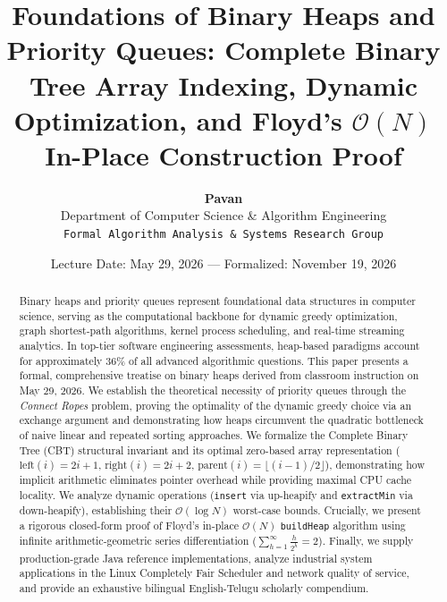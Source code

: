 \documentclass[10pt,twocolumn,letterpaper]{article}
\begin{document}
\title{\Large\bfseries Foundations of Binary Heaps and Priority Queues: Complete Binary Tree Array Indexing, Dynamic Optimization, and Floyd's $\mathcal{O}(N)$ In-Place Construction Proof}

\author{\textbf{Pavan}\\
Department of Computer Science \& Algorithm Engineering\\
\texttt{Formal Algorithm Analysis \& Systems Research Group}
}

\date{Lecture Date: May 29, 2026 --- Formalized: November 19, 2026}

\maketitle
\thispagestyle{firstpage}

\begin{abstract}
Binary heaps and priority queues represent foundational data structures in computer science, serving as the computational backbone for dynamic greedy optimization, graph shortest-path algorithms, kernel process scheduling, and real-time streaming analytics. In top-tier software engineering assessments, heap-based paradigms account for approximately 36\% of all advanced algorithmic questions. This paper presents a formal, comprehensive treatise on binary heaps derived from classroom instruction on May 29, 2026. We establish the theoretical necessity of priority queues through the \emph{Connect Ropes} problem, proving the optimality of the dynamic greedy choice via an exchange argument and demonstrating how heaps circumvent the quadratic bottleneck of naive linear and repeated sorting approaches. We formalize the Complete Binary Tree (CBT) structural invariant and its optimal zero-based array representation ($\text{left}(i) = 2i+1$, $\text{right}(i) = 2i+2$, $\text{parent}(i) = \lfloor (i-1)/2 \rfloor$), demonstrating how implicit arithmetic eliminates pointer overhead while providing maximal CPU cache locality. We analyze dynamic operations (\texttt{insert} via up-heapify and \texttt{extractMin} via down-heapify), establishing their $\mathcal{O}(\log N)$ worst-case bounds. Crucially, we present a rigorous closed-form proof of Floyd's in-place $\mathcal{O}(N)$ \texttt{buildHeap} algorithm using infinite arithmetic-geometric series differentiation ($\sum_{h=1}^\infty \frac{h}{2^h} = 2$). Finally, we supply production-grade Java reference implementations, analyze industrial system applications in the Linux Completely Fair Scheduler and network quality of service, and provide an exhaustive bilingual English-Telugu scholarly compendium.
\end{abstract}
\end{document}

